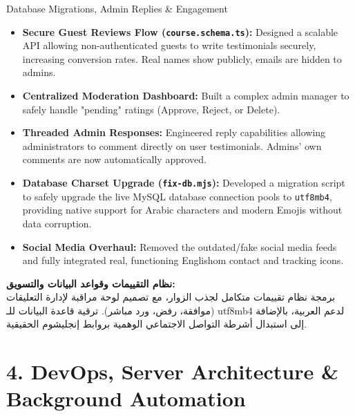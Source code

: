 \documentclass[11pt,a4paper]{article}
\begin{document}
\begin{topicbox}{Database Migrations, Admin Replies \& Engagement}
\begin{itemize}[leftmargin=*]
\item \textbf{Secure Guest Reviews Flow (\texttt{course.schema.ts}):} Designed a scalable API allowing non-authenticated guests to write testimonials securely, increasing conversion rates. Real names show publicly, emails are hidden to admins.
\item \textbf{Centralized Moderation Dashboard:} Built a complex admin manager to safely handle "pending" ratings (Approve, Reject, or Delete).
\item \textbf{Threaded Admin Responses:} Engineered reply capabilities allowing administrators to comment directly on user testimonials. Admins' own comments are now automatically approved.
\item \textbf{Database Charset Upgrade (\texttt{fix-db.mjs}):} Developed a migration script to safely upgrade the live MySQL database connection pools to \texttt{utf8mb4}, providing native support for Arabic characters and modern Emojis without data corruption.
\item \textbf{Social Media Overhaul:} Removed the outdated/fake social media feeds and fully integrated real, functioning Englishom contact and tracking icons.
\end{itemize}
\end{topicbox}
\begin{arabicbox}
\textbf{\textarabic{نظام التقييمات وقواعد البيانات والتسويق:}}\\
\textarabic{برمجة نظام تقييمات متكامل لجذب الزوار، مع تصميم لوحة مراقبة لإدارة التعليقات (موافقة، رفض، ورد مباشر). ترقية قاعدة البيانات للـ} \textenglish{utf8mb4} \textarabic{لدعم العربية، بالإضافة إلى استبدال أشرطة التواصل الاجتماعي الوهمية بروابط إنجليشوم الحقيقية.}
\end{arabicbox}

\section{4. DevOps, Server Architecture \& Background Automation}
\end{document}
